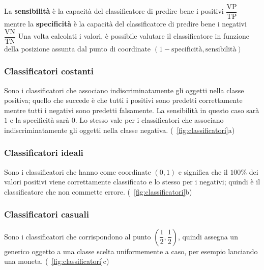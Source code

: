 La \textbf{sensibilità} è la capacità del classificatore di predire bene i positivi $\dfrac{\text{VP}}{\text{TP}}$ mentre la \textbf{specificità} è la capacità del classificatore di predire bene i negativi $\dfrac{\text{VN}}{\text{TN}}$
\newline
Una volta calcolati i valori, è possibile valutare il classificatore in funzione della posizione assunta dal punto di coordinate $(1 - \text{specificità}, \text{sensibilità})$

\subsubsection{Classificatori costanti} 
Sono i classificatori che associano indiscriminatamente gli oggetti nella classe positiva; quello che succede è che tutti i positivi sono predetti correttamente mentre tutti i negativi sono predetti falsamente. La sensibilità in questo caso sarà $1$ e la specificità sarà $0$. Lo stesso vale per i classificatori che associano indiscriminatamente gli oggetti nella classe negativa. (\figurename \ \ref{fig:classificatori}a)

\subsubsection{Classificatori ideali}
Sono i classificatori che hanno come coordinate $(0, 1)$ e significa che il $100\%$ dei valori positivi viene correttamente classificato e lo stesso per i negativi; quindi è il classificatore che non commette errore. (\figurename \ \ref{fig:classificatori}b)

\subsubsection{Classificatori casuali}
Sono i classificatori che corrispondono al punto $\left(\dfrac{1}{2},\dfrac{1}{2}\right)$, quindi assegna un generico oggetto a una classe scelta uniformemente a caso, per esempio lanciando una moneta. (\figurename \ \ref{fig:classificatori}c)

